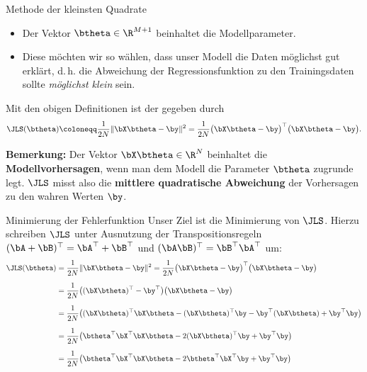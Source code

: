 \begin{frame}{Methode der kleinsten Quadrate}{}
	\begin{itemize}
		\item Der Vektor $\btheta \in \R^{M+1}$ beinhaltet die Modellparameter.
		\item Diese möchten wir so wählen, dass unser Modell die Daten möglichst gut erklärt,
			d.\,h. die Abweichung der Regressionsfunktion zu den Trainingsdaten sollte \textit{möglichst klein} sein.
	\end{itemize}

	\begin{mydef}
		Mit den obigen Definitionen ist der  gegeben durch
		\begin{equation*}
			\JLS(\btheta)
				\coloneqq \frac{1}{2N} \Vert \bX \btheta - \by \Vert^2
				= \frac{1}{2N} \bigl( \bX \btheta - \by \bigr)^\top \bigl( \bX \btheta - \by \bigr).
		\end{equation*}
	\end{mydef}

	\begin{boxGray}
		\textbf{Bemerkung:} Der Vektor $\bX \btheta \in \R^N$ beinhaltet die \textbf{Modellvorhersagen},
		wenn man dem Modell die Parameter $\btheta$ zugrunde legt.
		$\JLS$ misst also die \textbf{mittlere quadratische Abweichung} der Vorhersagen zu den wahren Werten $\by$.
	\end{boxGray}
\end{frame}


\begin{frame}{Minimierung der Fehlerfunktion}{}
	Unser Ziel ist die Minimierung von $\JLS$. Hierzu schreiben $\JLS$ unter Ausnutzung der Transpositionsregeln
	$(\bA + \bB)^\top = \bA^\top + \bB^\top$ und $(\bA \bB)^\top = \bB^\top \bA^\top$ um:
	\begin{align*}
		\JLS(\btheta)
			&= \frac{1}{2N} \Vert \bX \btheta - \by \Vert^2
				= \frac{1}{2N} \bigl( \bX \btheta - \by \bigr)^\top \bigl( \bX \btheta - \by \bigr)
	\\[2mm]
			&= \frac{1}{2N} \bigl( (\bX \btheta)^\top - \by^\top \bigr) \bigl( \bX \btheta - \by \bigr)
	\\[2mm]
			&= \frac{1}{2N} \bigl( (\bX \btheta)^\top \bX \btheta - (\bX \btheta)^\top \by - \by^\top (\bX \btheta) +
				\by^\top \by \bigr)
	\\[2mm]
			&= \frac{1}{2N} \bigl( \btheta^\top \bX^\top \bX \btheta - 2 (\bX \btheta)^\top \by + \by^\top \by \bigr)
	\\[2mm]
			&= \frac{1}{2N} \bigl( \btheta^\top \bX^\top \bX \btheta - 2 \btheta^\top \bX^\top \by + \by^\top \by \bigr)
	\end{align*}
\end{frame}


